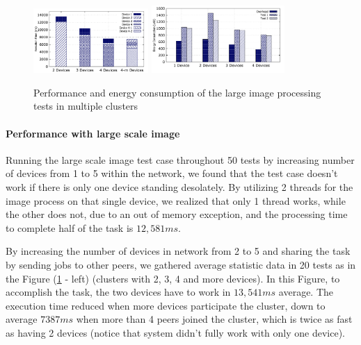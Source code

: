 \documentclass{sig-alternate}[10pt]
\begin{document}
\begin{CCSXML}
\begin{figure}
	\centering
		\includegraphics[width=0.39\textwidth]{data/img_perf.pdf}
		\includegraphics[width=0.45\textwidth]{data/img_energy.pdf}
	\caption{Performance and energy consumption of the large image processing tests in multiple clusters}
	\label{fig:cluster_performance}
\end{figure}

\paragraph{Performance with large scale image}
Running the large scale image test case throughout 50 tests by increasing number of devices from 1 to 5 within the network, we found that the test case doesn't work if there is only one device standing desolately. By utilizing 2 threads for the image process on that single device, we realized that only 1 thread works, while the other does not, due to an out of memory exception, and the processing time to complete half of the task is $12,581ms$. 

By increasing the number of devices in network from 2 to 5 and sharing the task by sending jobs to other peers, we gathered average statistic data in 20 tests as in the Figure (\ref{fig:cluster_performance} - left) (clusters with 2, 3, 4 and more devices). In this Figure, to accomplish the task, the two devices have to work in $13,541ms$ average. The execution time reduced when more devices participate the cluster, down to average $7387ms$ when more than 4 peers joined the cluster, which is twice as fast as having 2 devices (notice that system didn't fully work with only one device).


\end{CCSXML}
\end{document}
